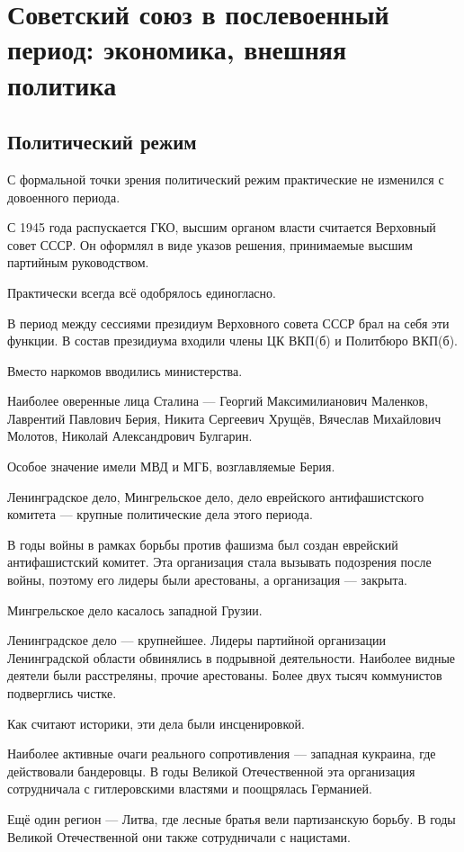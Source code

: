 \documentclass{article}
\begin{document}
\section{Советский союз в послевоенный период: экономика, внешняя политика}
\subsection{Политический режим}
\par С формальной точки зрения политический режим практические не изменился с довоенного периода.

С 1945 года распускается ГКО, высшим органом власти считается Верховный совет СССР. Он оформлял в виде указов решения, принимаемые высшим партийным руководством.

Практически всегда всё одобрялось единогласно.

В период между сессиями президиум Верховного совета СССР брал на себя эти функции. В состав президиума входили члены ЦК ВКП(б) и Политбюро ВКП(б).

Вместо наркомов вводились министерства. 

Наиболее оверенные лица Сталина --- Георгий Максимилианович Маленков, Лаврентий Павлович Берия, Никита Сергеевич Хрущёв, Вячеслав Михайлович Молотов, Николай Александрович Булгарин.

Особое значение имели МВД и МГБ, возглавляемые Берия.

Ленинградское дело, Мингрельское дело, дело еврейского антифашистского комитета --- крупные политические дела этого периода.

В годы войны в рамках борьбы против фашизма был создан еврейский антифашистский комитет. Эта организация стала вызывать подозрения после войны, поэтому его лидеры были арестованы, а организация --- закрыта.

Мингрельское дело касалось западной Грузии.

Ленинградское дело --- крупнейшее. Лидеры партийной организации Ленинградской области обвинялись в подрывной деятельности. Наиболее видные деятели были расстреляны, прочие арестованы. Более двух тысяч коммунистов подверглись чистке.

Как считают историки, эти дела были инсценировкой.

Наиболее активные очаги реального сопротивления --- западная кукраина, где действовали бандеровцы. В годы Великой Отечественной эта организация сотрудничала с гитлеровскими властями и поощрялась Германией.

Ещё один регион --- Литва, где лесные братья вели партизанскую борьбу. В годы Великой Отечественной они также сотрудничали с нацистами.
\end{document}

